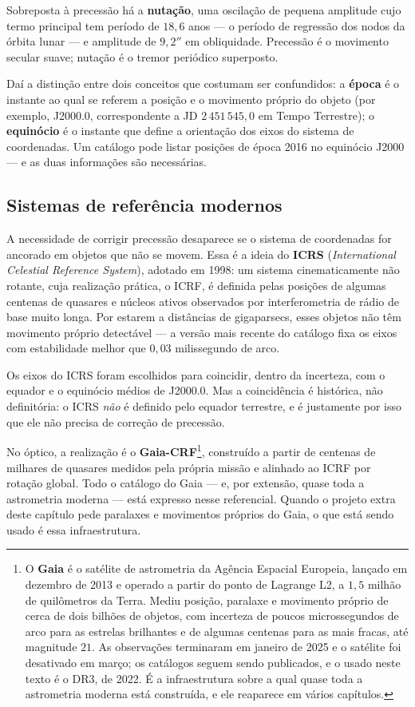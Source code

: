 \documentclass[11pt,a4paper]{article}
\begin{document}
Sobreposta à precessão há a \textbf{nutação}, uma oscilação de pequena amplitude cujo termo principal tem período de $18{,}6$ anos --- o período de regressão dos nodos da órbita lunar --- e amplitude de $9{,}2''$ em obliquidade. Precessão é o movimento secular suave; nutação é o tremor periódico superposto.

Daí a distinção entre dois conceitos que costumam ser confundidos: a \textbf{época} é o instante ao qual se referem a posição e o movimento próprio do objeto (por exemplo, J2000.0, correspondente a JD $2\,451\,545{,}0$ em Tempo Terrestre); o \textbf{equinócio} é o instante que define a orientação dos eixos do sistema de coordenadas. Um catálogo pode listar posições de época 2016 no equinócio J2000 --- e as duas informações são necessárias.

\subsection*{Sistemas de referência modernos}

A necessidade de corrigir precessão desaparece se o sistema de coordenadas for ancorado em objetos que não se movem. Essa é a ideia do \textbf{ICRS} (\textit{International Celestial Reference System}), adotado em 1998: um sistema cinematicamente não rotante, cuja realização prática, o ICRF, é definida pelas posições de algumas centenas de quasares e núcleos ativos observados por interferometria de rádio de base muito longa. Por estarem a distâncias de gigaparsecs, esses objetos não têm movimento próprio detectável --- a versão mais recente do catálogo fixa os eixos com estabilidade melhor que $0{,}03$ milissegundo de arco.

Os eixos do ICRS foram escolhidos para coincidir, dentro da incerteza, com o equador e o equinócio médios de J2000.0. Mas a coincidência é histórica, não definitória: o ICRS \emph{não} é definido pelo equador terrestre, e é justamente por isso que ele não precisa de correção de precessão.

No óptico, a realização é o \textbf{Gaia-CRF}\footnote{O \textbf{Gaia} é o satélite de astrometria da Agência Espacial Europeia, lançado em dezembro de 2013 e operado a partir do ponto de Lagrange L2, a $1{,}5$ milhão de quilômetros da Terra. Mediu posição, paralaxe e movimento próprio de cerca de dois bilhões de objetos, com incerteza de poucos microssegundos de arco para as estrelas brilhantes e de algumas centenas para as mais fracas, até magnitude $21$. As observações terminaram em janeiro de 2025 e o satélite foi desativado em março; os catálogos seguem sendo publicados, e o usado neste texto é o DR3, de 2022. É a infraestrutura sobre a qual quase toda a astrometria moderna está construída, e ele reaparece em vários capítulos.}, construído a partir de centenas de milhares de quasares medidos pela própria missão e alinhado ao ICRF por rotação global. Todo o catálogo do Gaia --- e, por extensão, quase toda a astrometria moderna --- está expresso nesse referencial. Quando o projeto extra deste capítulo pede paralaxes e movimentos próprios do Gaia, o que está sendo usado é essa infraestrutura.
\end{document}
